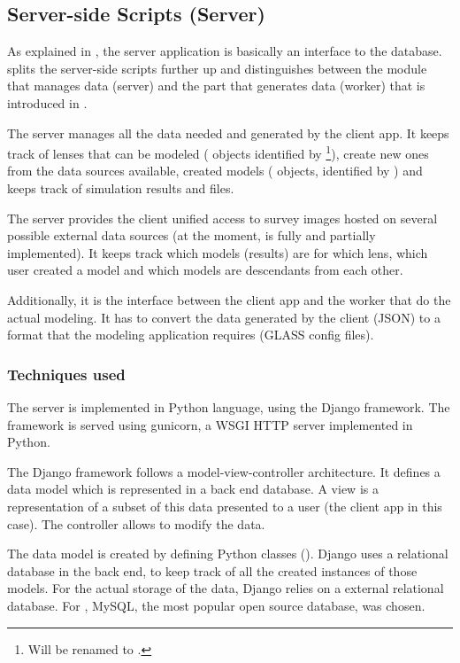 \subsection{Server-side Scripts (Server)}
\label{sec:server}

As explained in , the server application is basically an interface to the database.
\spl splits the server-side scripts further up and distinguishes between the module that manages data (server) and the part that generates data (worker) that is introduced in .

The server manages all the data needed and generated by the client app.
It keeps track of lenses that can be modeled ( objects identified by \footnote{Will be renamed to .}), create new ones from the data sources available, created models ( objects, identified by ) and keeps track of simulation results and files.

The server provides the client unified access to survey images hosted on several possible external data sources (at the moment, \sw is fully and \ml partially implemented).
It keeps track which models (results) are for which lens, which user created a model and which models are descendants from each other.

Additionally, it is the interface between the client app and the worker that do the actual modeling.
It has to convert the data generated by the client (JSON) to a format that the modeling application requires (GLASS config files).


\subsubsection{Techniques used}

The server is implemented in Python language, using the Django framework.
The framework is served using gunicorn, a WSGI HTTP server implemented in Python.

The Django framework follows a model-view-controller architecture.
It defines a data model which is represented in a back end database.
A view is a representation of a subset of this data presented to a user (the client app in this case).
The controller allows to modify the data.

The data model is created by defining Python classes ().
Django uses a relational database in the back end, to keep track of all the created instances of those models.
For the actual storage of the data, Django relies on a external relational database.
For \spl, MySQL, the most popular\cite{dbranking} open source database, was chosen.

